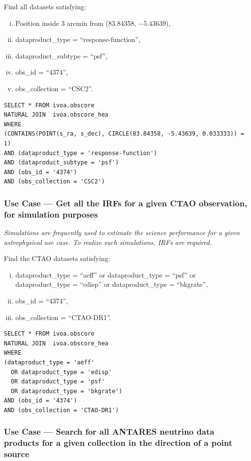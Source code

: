 \medskip
\noindent Find all datasets satisfying:
\begin{enumerate}[(i)]
  \item Position inside 3 arcmin from (83.84358, $-5.43639$),
  \item dataproduct\_type = ``response-function'',
  \item dataproduct\_subtype = ``psf'',
  \item obs\_id = ``4374'',
  \item obs\_collection = ``CSC2''.
\end{enumerate}

\begin{verbatim}
SELECT * FROM ivoa.obscore
NATURAL JOIN  ivoa.obscore_hea
WHERE
(CONTAINS(POINT(s_ra, s_dec), CIRCLE(83.84358, -5.43639, 0.033333)) = 1)
AND (dataproduct_type = 'response-function')
AND (dataproduct_subtype = 'psf')
AND (obs_id = '4374')
AND (obs_collection = 'CSC2')
\end{verbatim}


\subsubsection{Use Case --- Get all the \glspl{IRF} for a given CTAO observation, for simulation purposes}

{\em Simulations are frequently used to estimate the science performance for a given astrophysical use case. To realize such simulations, \glspl{IRF} are required.\/ }

\medskip
\noindent Find the CTAO datasets satisfying:
\begin{enumerate}[(i)]
  \item dataproduct\_type = ``aeff'' or dataproduct\_type = ``psf'' or dataproduct\_type = ``edisp'' or dataproduct\_type = ``bkgrate'',
  \item obs\_id = ``4374'',
  \item obs\_collection = ``CTAO-DR1''.
\end{enumerate}

\begin{verbatim}
SELECT * FROM ivoa.obscore
NATURAL JOIN  ivoa.obscore_hea
WHERE
(dataproduct_type = 'aeff'
  OR dataproduct_type = 'edisp'
  OR dataproduct_type = 'psf'
  OR dataproduct_type = 'bkgrate')
AND (obs_id = '4374')
AND (obs_collection = 'CTAO-DR1')
\end{verbatim}

\subsubsection{Use Case --- Search for all ANTARES neutrino data products for a given collection in the direction of a point source}

